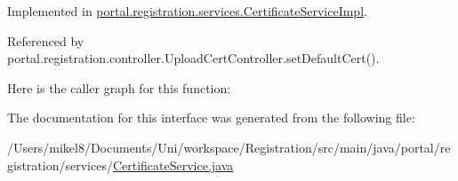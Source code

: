 Implemented in \hyperlink{classportal_1_1registration_1_1services_1_1CertificateServiceImpl_abac3e70bf6b1f63ca1d96e0829365f5c}{portal.registration.services.CertificateServiceImpl}.



Referenced by portal.registration.controller.UploadCertController.setDefaultCert().



Here is the caller graph for this function:




The documentation for this interface was generated from the following file:\begin{DoxyCompactItemize}
\item 
/Users/mikel8/Documents/Uni/workspace/Registration/src/main/java/portal/registration/services/\hyperlink{CertificateService_8java}{CertificateService.java}\end{DoxyCompactItemize}

